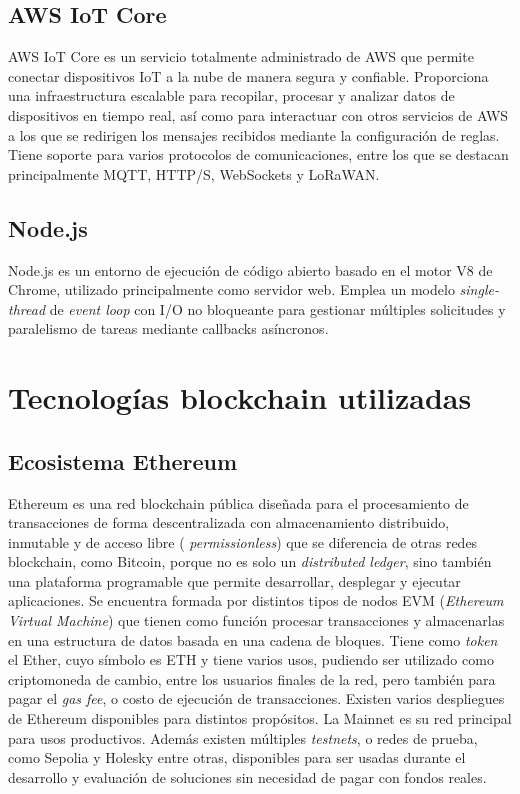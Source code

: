 \subsection{AWS IoT Core}

AWS IoT Core \citep{aws_iot_core} es un servicio totalmente administrado de AWS que permite conectar dispositivos IoT a la nube de manera segura y confiable. Proporciona una infraestructura escalable para recopilar, procesar y analizar datos de dispositivos en tiempo real, así como para interactuar con otros servicios de AWS a los que se redirigen los mensajes recibidos mediante la configuración de reglas. Tiene soporte para varios protocolos de comunicaciones, entre los que se destacan principalmente MQTT, HTTP/S, WebSockets y LoRaWAN.

\subsection{Node.js}

Node.js \citep{nodejs} es un entorno de ejecución de código abierto basado en el motor V8 de Chrome, utilizado principalmente como servidor web. Emplea un modelo \textit{single-thread} de \textit{event loop} con I/O no bloqueante para gestionar múltiples solicitudes y paralelismo de tareas mediante callbacks asíncronos.


\section{Tecnologías blockchain utilizadas}


\subsection{Ecosistema Ethereum}

Ethereum \citep{ethereum} es una red blockchain pública diseñada para el procesamiento de transacciones de forma descentralizada con almacenamiento distribuido, inmutable y de acceso libre ( \textit{permissionless}) que se diferencia de otras redes blockchain, como Bitcoin, porque no es solo un \textit{distributed ledger}, sino también una plataforma programable que permite desarrollar, desplegar y ejecutar aplicaciones. Se encuentra formada por distintos tipos de nodos EVM (\textit{Ethereum Virtual Machine}) \citep{evm} que tienen como función procesar transacciones y almacenarlas en una estructura de datos basada en una cadena de bloques. Tiene como \textit{token} el Ether, cuyo símbolo es ETH y tiene varios usos, pudiendo ser utilizado como criptomoneda de cambio, entre los usuarios finales de la red, pero también para pagar el \textit{gas fee}, o costo de ejecución de transacciones. 
Existen varios despliegues de Ethereum disponibles para distintos propósitos. La Mainnet \citep{mainnet} es su red principal para usos productivos. Además existen múltiples \textit{testnets}, o redes de prueba, como Sepolia \citep{sepolia} y Holesky \citep{holesky} entre otras, disponibles para ser usadas durante el desarrollo y evaluación de soluciones sin necesidad de pagar con fondos reales. 


